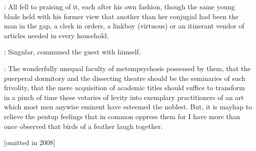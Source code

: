 :
All fell to praising of it,
each after his own fashion,
though the
same young blade held with his former view that another than her conjugial
had been the man in the gap,
a clerk in orders,
a linkboy
(virtuous)
or an
itinerant vendor of articles needed in every household.

:
Singular,
communed the guest with himself.

\Bloom:
The wonderfully unequal faculty of metempsychosis possessed by them,
that
the puerperal dormitory and the dissecting theatre should be the
seminaries of such frivolity,
that the mere acquisition of academic titles
should suffice to transform
in a pinch of time these votaries of levity
into exemplary practitioners of an art which most men anywise eminent have
esteemed the noblest.
But,
it is mayhap to relieve the pentup feelings
that in common oppress them for I have more than once observed that birds
of a feather laugh together.


[omitted in 2008]


